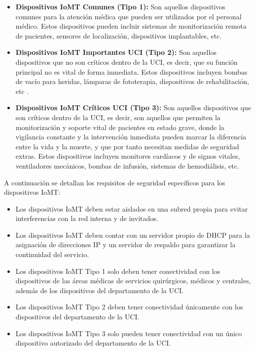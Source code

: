 \begin{itemize}
    \item \textbf{Dispositivos IoMT Comunes (Tipo 1):} Son aquellos dispositivos comunes para la atención médica que pueden ser utilizados por el personal 
    médico. Estos dispositivos pueden incluir sistemas de monitorización remota de pacientes, sensores de localización, dispositivos implantables, etc.
    \item \textbf{Dispositivos IoMT Importantes UCI (Tipo 2):} Son aquellos dispositivos que no son críticos dentro de la UCI, es decir, que su función principal no es vital de forma 
    inmediata. Estos dispositivos incluyen bombas de vacío para heridas, lámparas de fototerapia, dispositivos de rehabilitación, etc \cite{IoMT-UCI}.
    \item \textbf{Dispositivos IoMT Críticos UCI (Tipo 3):} Son aquellos dispositivos que son críticos dentro de la UCI, es decir, son aquellos que permiten la monitorización y soporte
    vital de pacientes en estado grave, donde la vigilancia constante y la intervención inmediata pueden marcar la diferencia entre la vida y la muerte, y que por tanto necesitan medidas
    de seguridad extras. Estos dispositivos incluyen monitores cardíacos y de signos vitales, ventiladores mecánicos, bombas de infusión, sistemas de hemodiálisis, etc\cite{IoMT-UCI}.
\end{itemize}
A continuación se detallan los requisitos de seguridad específicos para los dispositivos IoMT:
\begin{itemize}
    \item Los dispositivos IoMT deben estar aislados en una subred propia para evitar interferencias con la red interna y de invitados.
    \item Los dispositivos IoMT deben contar con un servidor propio de DHCP para la asignación de direcciones IP y un servidor de respaldo para garantizar la continuidad del servicio.
    \item Los dispositivos IoMT Tipo 1 solo deben tener conectividad con los dispositivos de las áreas médicas de servicios quirúrgicos, médicos y centrales, 
    además de los dispositivos del departamento de la UCI.
    \item Los dispositivos IoMT Tipo 2 deben tener conectividad únicamente con los dispositivos del departamento de la UCI.
    \item Los dispositivos IoMT Tipo 3 solo pueden tener conectividad con un único dispositivo autorizado del departamento de la UCI.
\end{itemize}

